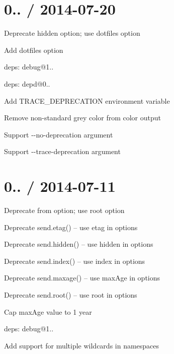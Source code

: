 \section*{0.. / 2014-\/07-\/20 }


\begin{DoxyItemize}
\item Deprecate {\ttfamily hidden} option; use {\ttfamily dotfiles} option
\item Add {\ttfamily dotfiles} option
\item deps\+: debug@1..
\item deps\+: depd@0..
\begin{DoxyItemize}
\item Add {\ttfamily T\+R\+A\+C\+E\+\_\+\+D\+E\+P\+R\+E\+C\+A\+T\+I\+O\+N} environment variable
\item Remove non-\/standard grey color from color output
\item Support {\ttfamily -\/-\/no-\/deprecation} argument
\item Support {\ttfamily -\/-\/trace-\/deprecation} argument
\end{DoxyItemize}
\end{DoxyItemize}

\section*{0.. / 2014-\/07-\/11 }


\begin{DoxyItemize}
\item Deprecate {\ttfamily from} option; use {\ttfamily root} option
\item Deprecate {\ttfamily send.\+etag()} -- use {\ttfamily etag} in {\ttfamily options}
\item Deprecate {\ttfamily send.\+hidden()} -- use {\ttfamily hidden} in {\ttfamily options}
\item Deprecate {\ttfamily send.\+index()} -- use {\ttfamily index} in {\ttfamily options}
\item Deprecate {\ttfamily send.\+maxage()} -- use {\ttfamily max\+Age} in {\ttfamily options}
\item Deprecate {\ttfamily send.\+root()} -- use {\ttfamily root} in {\ttfamily options}
\item Cap {\ttfamily max\+Age} value to 1 year
\item deps\+: debug@1..
\begin{DoxyItemize}
\item Add support for multiple wildcards in namespaces
\end{DoxyItemize}
\end{DoxyItemize}

